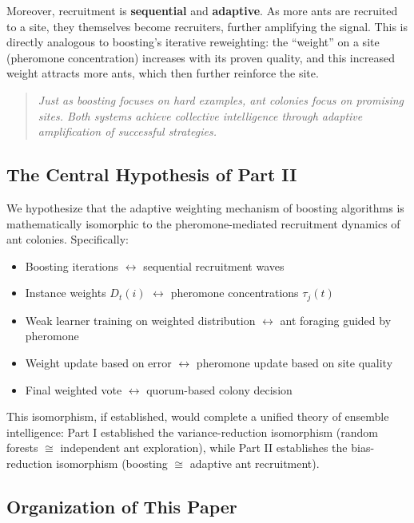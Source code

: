 \documentclass[12pt,letterpaper]{article}
\begin{document}
Moreover, recruitment is \textbf{sequential} and \textbf{adaptive}. As more ants are recruited to a site, they themselves become recruiters, further amplifying the signal. This is directly analogous to boosting's iterative reweighting: the ``weight'' on a site (pheromone concentration) increases with its proven quality, and this increased weight attracts more ants, which then further reinforce the site.

\begin{quote}
\textit{Just as boosting focuses on hard examples, ant colonies focus on promising sites. Both systems achieve collective intelligence through adaptive amplification of successful strategies.}
\end{quote}

\subsection{The Central Hypothesis of Part II}

We hypothesize that the adaptive weighting mechanism of boosting algorithms is mathematically isomorphic to the pheromone-mediated recruitment dynamics of ant colonies. Specifically:

\begin{itemize}
    \item Boosting iterations $\leftrightarrow$ sequential recruitment waves
    \item Instance weights $D_t(i)$ $\leftrightarrow$ pheromone concentrations $\tau_j(t)$
    \item Weak learner training on weighted distribution $\leftrightarrow$ ant foraging guided by pheromone
    \item Weight update based on error $\leftrightarrow$ pheromone update based on site quality
    \item Final weighted vote $\leftrightarrow$ quorum-based colony decision
\end{itemize}

This isomorphism, if established, would complete a unified theory of ensemble intelligence: Part I established the variance-reduction isomorphism (random forests $\cong$ independent ant exploration), while Part II establishes the bias-reduction isomorphism (boosting $\cong$ adaptive ant recruitment).

\subsection{Organization of This Paper}
\end{document}

